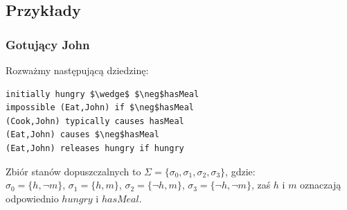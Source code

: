 \documentclass{article}
\begin{document}
\subsection{Przykłady}
\subsubsection{Gotujący John}

Rozważmy następującą dziedzinę:
\bigskip
{}
\begin{lstlisting}[mathescape=true]
initially hungry $\wedge$ $\neg$hasMeal 
impossible (Eat,John) if $\neg$hasMeal 
(Cook,John) typically causes hasMeal
(Eat,John) causes $\neg$hasMeal 
(Eat,John) releases hungry if hungry
\end{lstlisting}
Zbiór stanów dopuszczalnych to $\Sigma=\{\sigma_{0},\sigma_{1},\sigma_{2},\sigma_{3}\}$, gdzie:\\
$\sigma_{0}=\{h,\neg m\}$, $\sigma_{1}=\{h, m\}$, $\sigma_{2}=\{\neg h, m\}$, $\sigma_{3}=\{\neg h,\neg m\}$, zaś $h$ i $m$ oznaczają odpowiednio $hungry$ i $hasMeal$.\\
\end{document}

